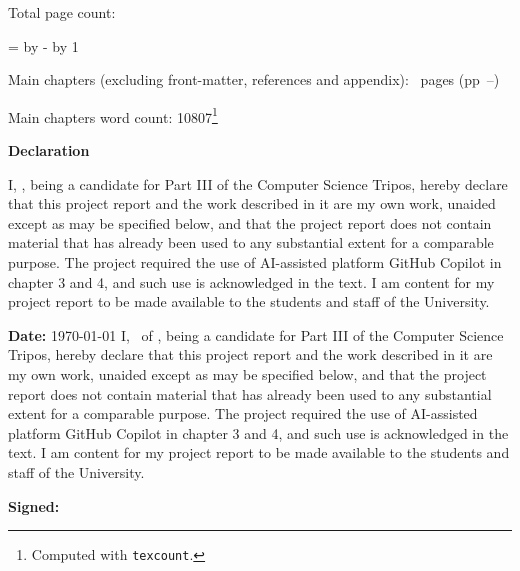 \begin{sffamily}
\begin{titlepage}
        \makeatother
    \end{titlepage}

    \newpage

    Total page count: \pageref{lastpage}

    \makeatletter
    \@tempcnta=\relax%
    \advance\@tempcnta by -%
    \advance\@tempcnta by 1%
    \xdef\contentpages{\the\@tempcnta}%
    \makeatother

    Main chapters (excluding front-matter, references and appendix):
    \contentpages~pages
    (pp~\pageref{firstcontentpage}--\pageref{lastcontentpage})

    Main chapters word count: 10807\footnote{Computed with \texttt{texcount}.}

\end{sffamily}

\vspace{\fill}
\onehalfspacing
\makeatletter
\textbf{\Huge Declaration}
\vspace{40pt}

\ifsubmission
    I, \candidatenumber, being a candidate for Part III of the Computer Science Tripos, hereby declare that this project report and the work described in it are my own work, unaided except as may be specified below, and that the project report does not contain material that has already been used to any substantial extent for a comparable purpose. The project required the use of AI-assisted platform GitHub Copilot in chapter 3 and 4, and such use is acknowledged in the text. I am content for my project report to be made available to the students and staff of the University.

    \bigskip
    \textbf{Date:} \today
\else
    I, \@author\ of \college, being a candidate for Part III of the Computer Science Tripos, hereby declare that this project report and the work described in it are my own work, unaided except as may be specified below, and that the project report does not contain material that has already been used to any substantial extent for a comparable purpose. The project required the use of AI-assisted platform GitHub Copilot in chapter 3 and 4, and such use is acknowledged in the text. I am content for my project report to be made available to the students and staff of the University.

    \bigskip
    \textbf{Signed:} \@author

